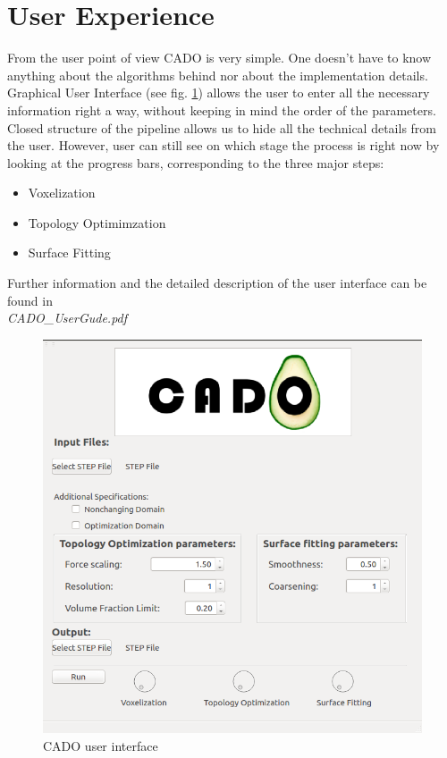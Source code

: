 \section{User Experience}
\label{sec:uex}
From the user point of view CADO  is very simple. One doesn't have to know anything about the algorithms behind nor about the implementation details. Graphical User Interface (see fig. \ref{fig:mainWindow}) allows the user to enter all the necessary information right a way, without keeping in mind the order of the parameters. Closed structure of the pipeline allows us to hide all the technical details from the user. However, user can still see on which stage the process is right now by looking at the progress bars, corresponding to the three major steps:
\begin{itemize}
\item Voxelization
\item Topology Optimimzation
\item Surface Fitting
\end{itemize}


Further information and the detailed description of the user interface can be found in \\
\textit{CADO\_UserGude.pdf}

\begin{figure}
\centering
\includegraphics[scale=0.4]{Pictures/CADO_mainWindow.png}
\caption{CADO user interface}
\label{fig:mainWindow}
\end{figure}

